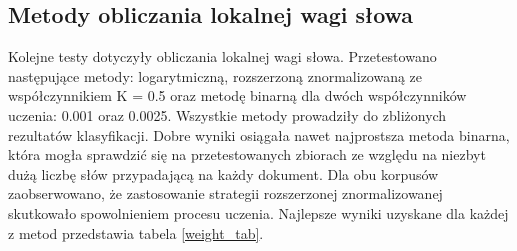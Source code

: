 \documentclass{pracamgr}
\begin{document}
\begin{table}[]
\centering
{}
\caption{Zależność między współczynnikiem doboru wag zerowych a najlepszą wartością miary F1 klasyfikatora - Reuters}
\label{zero_w_reut}
\end{table}

\subsection{Metody obliczania lokalnej wagi słowa}

Kolejne testy dotyczyły obliczania lokalnej wagi słowa. Przetestowano następujące metody: logarytmiczną, rozszerzoną znormalizowaną ze współczynnikiem K = 0.5 oraz metodę binarną dla dwóch współczynników uczenia: 0.001 oraz 0.0025. Wszystkie metody prowadziły do zbliżonych rezultatów klasyfikacji. Dobre wyniki osiągała nawet najprostsza metoda binarna, która mogła sprawdzić się na przetestowanych zbiorach ze względu na niezbyt dużą liczbę słów przypadającą na każdy dokument. Dla obu korpusów zaobserwowano, że zastosowanie strategii rozszerzonej znormalizowanej skutkowało spowolnieniem procesu uczenia. Najlepsze wyniki uzyskane dla każdej z metod przedstawia tabela \ref{weight_tab}.
\end{document}
